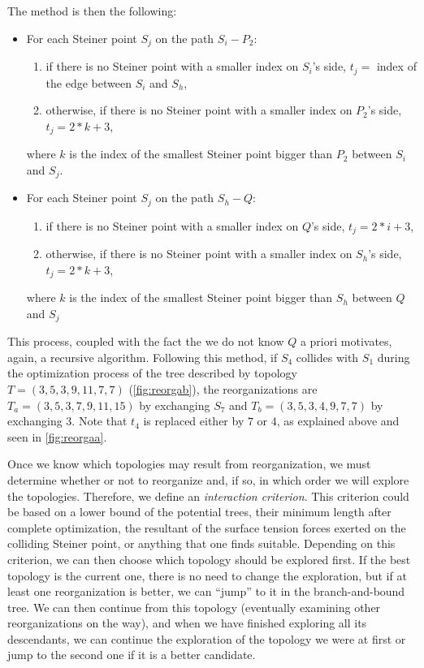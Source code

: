 \documentclass{article}
\theoremstyle{plain}
\begin{document}
The method is then the following: 
\begin{itemize}
	\item For each Steiner point $S_j$ on the path $S_i-P_2$:
		\begin{enumerate}
			\item if there is no Steiner point with a smaller index on $S_i$'s side, $t_j =$ index of the edge between $S_i$ and $S_h$,
			\item otherwise, if there is no Steiner point with a smaller index on $P_2$'s side, $t_j = 2 * k + 3$,
		\end{enumerate}
		where $k$ is the index of the smallest Steiner point bigger than $P_2$ between $S_i$ and $S_j$.

	\item For each Steiner point $S_j$ on the path $S_h-Q$:
		\begin{enumerate}
			\item if there is no Steiner point with a smaller index on $Q$'s side, $t_j = 2*i+3$,
			\item otherwise, if there is no Steiner point with a smaller index on $S_h$'s side, $t_j = 2*k+3$,
		\end{enumerate}
		where $k$ is the index of the smallest Steiner point bigger than $S_h$ between $Q$ and $S_j$
\end{itemize}
This process, coupled with the fact the we do not know $Q$ a priori motivates, again, a recursive algorithm.
Following this method, if $S_4$ collides with $S_1$ during the optimization process of the tree described by topology $T=(3,5,3,9,11,7,7)$ (\cref{fig:reorgab}), the reorganizations are $T_a = (3,5,3,7,9,11,15)$ by exchanging $S_7$ and $T_b = (3,5,3,4,9,7,7)$ by exchanging $3$. 
Note that $t_4$ is replaced either by $7$ or $4$, as explained above and seen in \cref{fig:reorgaa}. 






Once we know which topologies may result from reorganization, we must determine whether or not to reorganize and, if so, in which order we will explore the topologies. 
Therefore, we define an \emph{interaction criterion}. 
This criterion could be based on a lower bound of the potential trees, their minimum length after complete optimization, the resultant of the surface tension forces exerted on the colliding Steiner point, or anything that one finds suitable. Depending on this criterion, we can then choose which topology should be explored first. 
If the best topology is the current one, there is no need to change the exploration, but if at least one reorganization is better, we can ``jump'' to it in the \mbox{branch-and-bound} tree. 
We can then continue from this topology (eventually examining other reorganizations on the way), and when we have finished exploring all its descendants, we can continue the exploration of the topology we were at first or jump to the second one if it is a better candidate. 
\end{document}
